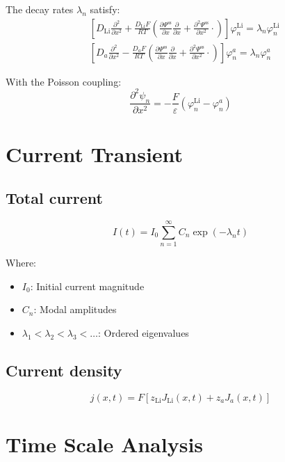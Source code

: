 \documentclass[11pt]{article}
\begin{document}
The decay rates $\lambda_n$ satisfy:
\begin{align}
&\left[D_{\text{Li}} \frac{\partial^2}{\partial x^2} + \frac{D_{\text{Li}} F}{RT}\left(\frac{\partial \Psi^{\text{ss}}}{\partial x} \frac{\partial}{\partial x} + \frac{\partial^2 \Psi^{\text{ss}}}{\partial x^2} \cdot\right)\right]\varphi_n^{\text{Li}} = \lambda_n \varphi_n^{\text{Li}} \\
&\left[D_a \frac{\partial^2}{\partial x^2} - \frac{D_a F}{RT}\left(\frac{\partial \Psi^{\text{ss}}}{\partial x} \frac{\partial}{\partial x} + \frac{\partial^2 \Psi^{\text{ss}}}{\partial x^2} \cdot\right)\right]\varphi_n^a = \lambda_n \varphi_n^a
\end{align}

With the Poisson coupling:
\begin{equation}
\frac{\partial^2 \psi_n}{\partial x^2} = -\frac{F}{\varepsilon}(\varphi_n^{\text{Li}} - \varphi_n^a)
\end{equation}

\section{Current Transient}

\subsection{Total current}
\begin{equation}
I(t) = I_0 \sum_{n=1}^{\infty} C_n \exp(-\lambda_n t)
\end{equation}

Where:
\begin{itemize}
\item $I_0$: Initial current magnitude
\item $C_n$: Modal amplitudes
\item $\lambda_1 < \lambda_2 < \lambda_3 < \ldots$: Ordered eigenvalues
\end{itemize}

\subsection{Current density}
\begin{equation}
j(x,t) = F\left[z_{\text{Li}} J_{\text{Li}}(x,t) + z_a J_a(x,t)\right]
\end{equation}

\section{Time Scale Analysis}
\end{document}

